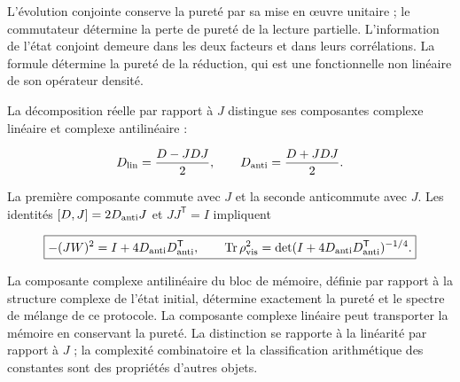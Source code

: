 L’évolution conjointe conserve la pureté par sa mise en œuvre unitaire ; le commutateur détermine la perte de pureté de la lecture partielle. L’information de l’état conjoint demeure dans les deux facteurs et dans leurs corrélations. La formule détermine la pureté de la réduction, qui est une fonctionnelle non linéaire de son opérateur densité.


La décomposition réelle par rapport à \(J\) distingue ses composantes complexe linéaire et complexe antilinéaire :



\[
D_{\rm lin}=\frac{D-JDJ}{2},\qquad
D_{\rm anti}=\frac{D+JDJ}{2}.
\]



La première composante commute avec \(J\) et la seconde anticommute avec \(J\). Les identités
\([D,J]=2D_{\rm anti}J\) et \(JJ^{\mathsf T}=I\) impliquent



\begin{equation}
\boxed{-(JW)^2=I+4D_{\rm anti}D_{\rm anti}^{\mathsf T},\qquad
\operatorname{Tr}\rho_{\rm vis}^2
=\det(I+4D_{\rm anti}D_{\rm anti}^{\mathsf T})^{-1/4}.}
\label{nuc12:eq:6.6}
\end{equation}



La composante complexe antilinéaire du bloc de mémoire, définie par rapport à la structure complexe de l’état initial, détermine exactement la pureté et le spectre de mélange de ce protocole. La composante complexe linéaire peut transporter la mémoire en conservant la pureté. La distinction se rapporte à la linéarité par rapport à \(J\) ; la complexité combinatoire et la classification arithmétique des constantes sont des propriétés d’autres objets.
